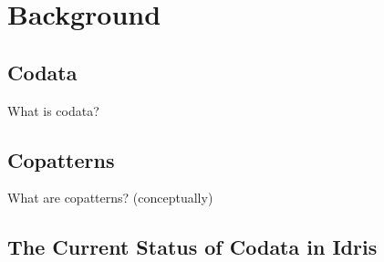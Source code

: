 \section{Background}
\label{sec:background}

\subsection{Codata}
What is codata?

\subsection{Copatterns}
What are copatterns? (conceptually)













\subsection{The Current Status of Codata in Idris}
